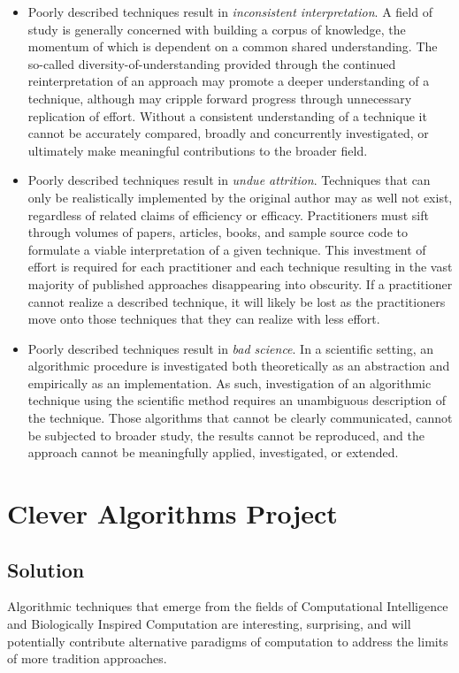 \documentclass[a4paper, 11pt]{article}
\begin{document}
\begin{itemize}
	\item Poorly described techniques result in \emph{inconsistent interpretation}. A field of study is generally concerned with building a corpus of knowledge, the momentum of which is dependent on a common shared understanding. The so-called diversity-of-understanding provided through the continued reinterpretation of an approach may promote a deeper understanding of a technique, although may cripple forward progress through unnecessary replication of effort. Without a consistent understanding of a technique it cannot be accurately compared, broadly and concurrently investigated, or ultimately make meaningful contributions to the broader field. 
	\item Poorly described techniques result in \emph{undue attrition}. Techniques that can only be realistically implemented by the original author may as well not exist, regardless of related claims of efficiency or efficacy. Practitioners must sift through volumes of papers, articles, books, and sample source code to formulate a viable interpretation of a given technique. This investment of effort is required for each practitioner and each technique resulting in the vast majority of published approaches disappearing into obscurity. If a practitioner cannot realize a described technique, it will likely be lost as the practitioners move onto those techniques that they can realize with less effort.
	\item Poorly described techniques result in \emph{bad science}. In a scientific setting, an algorithmic procedure is investigated both theoretically as an abstraction and empirically as an implementation. As such, investigation of an algorithmic technique using the scientific method requires an unambiguous description of the technique. Those algorithms that cannot be clearly communicated, cannot be subjected to broader study, the results cannot be reproduced, and the approach cannot be meaningfully applied, investigated, or extended. 
\end{itemize}

\section{Clever Algorithms Project}
\label{sec:project}

\subsection{Solution}
Algorithmic techniques that emerge from the fields of Computational Intelligence and Biologically Inspired Computation are interesting, surprising, and will potentially contribute alternative paradigms of computation to address the limits of more tradition approaches. 
\end{document}
